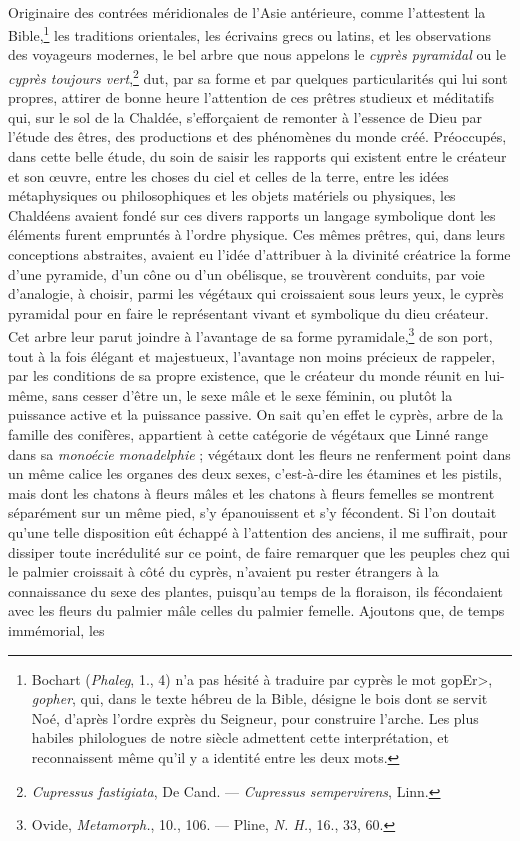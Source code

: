 \documentclass[a4paper, 11pt, oneside, polutonikogreek, french]{article}
\begin{document}
\paragraph{}
Originaire des contrées méridionales de l'Asie antérieure, comme l'attestent la Bible,\footnote{Bochart (\emph{Phaleg}, 1., 4) n'a pas hésité à traduire par cyprès le mot \<gopEr>, \emph{gopher}, qui, dans le texte hébreu de la Bible, désigne le bois dont se servit Noé, d'après l'ordre exprès du Seigneur, pour construire l'arche. Les plus habiles philologues de notre siècle admettent cette interprétation, et reconnaissent même qu'il y a identité entre les deux mots.} les traditions orientales, les écrivains grecs ou latins, et les observations des voyageurs modernes, le bel arbre que nous appelons le \emph{cyprès pyramidal} ou le \emph{cyprès toujours vert},\footnote{\emph{Cupressus fastigiata}, De Cand. --- \emph{Cupressus sempervirens}, Linn.} dut, par sa forme et par quelques particularités qui lui sont propres, attirer de bonne heure l'attention de ces prêtres studieux et méditatifs qui, sur le sol de la Chaldée, s'efforçaient de remonter à l'essence de Dieu par l'étude des êtres, des productions et des phénomènes du monde créé. Préoccupés, dans cette belle étude, du soin de saisir les rapports qui existent entre le créateur et son œuvre, entre les choses du ciel et celles de la terre, entre les idées métaphysiques ou philosophiques et les objets matériels ou physiques, les Chaldéens avaient fondé sur ces divers rapports un langage symbolique dont les éléments furent empruntés à l'ordre physique. Ces mêmes prêtres, qui, dans leurs conceptions abstraites, avaient eu l'idée d'attribuer à la divinité créatrice la forme d'une pyramide, d'un cône ou d'un obélisque, se trouvèrent conduits, par voie d'analogie, à choisir, parmi les végétaux qui croissaient sous leurs yeux, le cyprès pyramidal pour en faire le représentant vivant et symbolique du dieu créateur. Cet arbre leur parut joindre à l'avantage de sa forme pyramidale,\footnote{Ovide, \emph{Metamorph.}, 10., 106. --- Pline, \emph{N. H.}, 16., 33, 60.} de son port, tout à la fois élégant et majestueux, l'avantage non moins précieux de rappeler, par les conditions de sa propre existence, que le créateur du monde réunit en lui-même, sans cesser d'être un, le sexe mâle et le sexe féminin, ou plutôt la puissance active et la puissance passive. On sait qu'en effet le cyprès, arbre de la famille des conifères, appartient à cette catégorie de végétaux que Linné range dans sa \emph{monoécie monadelphie} ; végétaux dont les fleurs ne renferment point dans un même calice les organes des deux sexes, c'est-à-dire les étamines et les pistils, mais dont les chatons à fleurs mâles et les chatons à fleurs femelles se montrent séparément sur un même pied, s'y épanouissent et s'y fécondent. Si l'on doutait qu'une telle disposition eût échappé à l'attention des anciens, il me suffirait, pour dissiper toute incrédulité sur ce point, de faire remarquer que les peuples chez qui le palmier croissait à côté du cyprès, n'avaient pu rester étrangers à la connaissance du sexe des plantes, puisqu'au temps de la floraison, ils fécondaient avec les fleurs du palmier mâle celles du palmier femelle. Ajoutons que, de temps immémorial, les 
\end{document}
